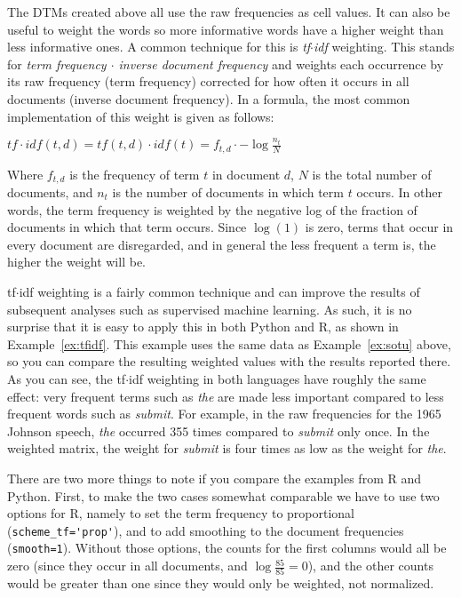 The DTMs created above all use the raw frequencies as cell values.
It can also be useful to weight the words so more informative words have a higher weight than less informative ones.
A common technique for this is \emph{tf$\cdot$idf} weighting.
This stands for \emph{term frequency $\cdot$ inverse document frequency} and weights each occurrence by its raw frequency (term frequency) corrected for how often it occurs in all documents (inverse document frequency). In a formula, the most common implementation of this weight is given as follows:

$tf\cdot idf(t,d)=tf(t,d)\cdot idf(t)=f_{t,d}\cdot -\log \frac{n_t}{N}$

Where $f_{t,d}$ is the frequency of term $t$ in document $d$, $N$ is the total number of documents, and $n_t$ is the number of documents in which term $t$ occurs. In other words, the term frequency is weighted by the negative log of the fraction of documents in which that term occurs. Since $\log(1)$ is zero, terms that occur in every document are disregarded, and in general the less frequent a term is, the higher the weight will be.



tf$\cdot$idf weighting is a fairly common technique and can improve the results of subsequent analyses such as supervised machine learning.
As such, it is no surprise that it is easy to apply this in both Python and R, as shown in Example~\ref{ex:tfidf}.
This example uses the same data as Example~\ref{ex:sotu} above, so you can compare the resulting weighted values with the results reported there.
As you can see, the tf$\cdot$idf weighting in both languages have roughly the same effect:
very frequent terms such as \emph{the} are made less important compared to less frequent words such as \emph{submit}.
For example, in the raw frequencies for the 1965 Johnson speech, \emph{the} occurred 355 times compared to \emph{submit} only once.
In the weighted matrix, the weight for \emph{submit} is four times as low as the weight for \emph{the}.

There are two more things to note if you compare the examples from R and Python.
First, to make the two cases somewhat comparable we have to use two options for R, namely to set the term frequency to proportional (\verb|scheme_tf='prop'|),
and to add smoothing to the document frequencies (\verb|smooth=1|).
Without those options, the counts for the first columns would all be zero (since they occur in all documents, and $\log \frac{85}{85}=0$),
and the other counts would be greater than one since they would only be weighted, not normalized.

